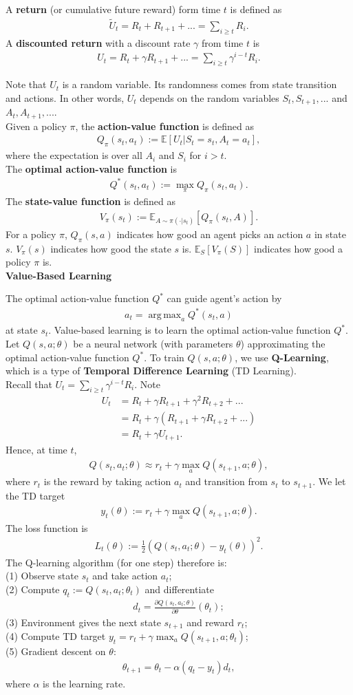 \documentclass[12pt,oneside]{article}
\newcommand{\BE}[0]{\mathbb{E}}
\newcommand{\ali}[1]{\begin{align*}#1\end{align*}}
\newcommand{\ga}[0]{\gamma}
\DeclareMathOperator*{\argmax}{arg\,max}
\theoremstyle{plain}
\theoremstyle{remark}
\begin{document}
A {\bf return} (or cumulative future reward) form time $t$ is defined as 
\ali{\tilde{U}_t = R_t + R_{t+1} + ... = \sum_{i \geq t} R_i.}
A {\bf discounted return} with a discount rate $\ga$ from time $t$ is 
\ali{U_t  = R_t + \ga R_{t+1} + ... = \sum_{i \geq t} \ga^{i-t} R_i.}

Note that $U_t$ is a random variable. Its randomness comes from state transition and actions. In other words, $U_t$ depends on the random variables $S_t, S_{t+1},...$ and $A_t, A_{t+1},...$.\\

Given a policy $\pi$, the {\bf action-value function} is defined as
 \ali{Q_\pi(s_t, a_t) := \BE \left[ U_t | S_t = s_t, A_t = a_t \right],}
where the expectation is over all $A_{i}$ and $S_i$ for $i > t$.\\
The {\bf optimal action-value function} is 
\ali{Q^*(s_t, a_t) := \max_\pi  Q_\pi(s_t, a_t).}
The {\bf state-value function} is defined as 
\ali{V_\pi(s_t) := \BE_{A \sim \pi(\cdot| s_t)} \left[ Q_\pi(s_t, A) \right].}
For a policy $\pi$, $Q_\pi(s,a)$ indicates how good an agent picks an action $a$ in state $s$. $V_\pi(s)$ indicates how good the state $s$ is. $\BE_S \left[ V_\pi(S) \right]$ indicates how good a policy $\pi$ is.\\

{\bf Value-Based Learning\\}

The optimal action-value function $Q^*$ can guide agent's action by 
\ali{a_t = \argmax_a Q^*(s_t, a)}
at state $s_t$. Value-based learning is to learn the optimal action-value function $Q^*$.\\
Let $Q(s, a; \theta)$ be a neural network (with parameters $\theta$) approximating the optimal action-value function $Q^*$. To train $Q(s, a; \theta)$, we use {\bf Q-Learning}, which is a type of {\bf Temporal Difference Learning} (TD Learning).\\
Recall that $U_t = \sum_{i \geq t} \ga^{i-t} R_i$. Note 
\ali{U_t &= R_t + \ga R_{t+1} + \ga^2 R_{t+2} + ... \\
         &= R_t + \ga (R_{t+1} + \ga R_{t+2} + ...) \\
         &= R_t + \ga U_{t+1}.}
Hence, at time $t$,
\ali{Q(s_t, a_t; \theta) \approx r_t + \ga \max_a Q(s_{t+1}, a; \theta),}
where $r_t$ is the reward by taking action $a_t$ and transition from $s_t$ to $s_{t+1}$. We let the TD target 
\ali{y_t(\theta) := r_t + \ga \max_a Q(s_{t+1}, a; \theta).}
The loss function is 
\ali{L_t(\theta) := \frac{1}{2} (Q(s_t, a_t; \theta) - y_t(\theta))^2.}
The Q-learning algorithm (for one step) therefore is:\\
(1) Observe state $s_t$ and take action $a_t$;\\
(2) Compute $q_t := Q(s_t, a_t; \theta_t)$ and differentiate 
\ali{d_t = \frac{\partial Q(s_t, a_t; \theta)}{\partial \theta}(\theta_t);}
(3) Environment gives the next state $s_{t+1}$ and reward $r_t$;\\
(4) Compute TD target $y_t = r_t + \ga \max_a Q(s_{t+1}, a; \theta_t)$;\\
(5) Gradient descent on $\theta$: 
\ali{\theta_{t+1} = \theta_t - \alpha (q_t - y_t) d_t,}
where $\alpha$ is the learning rate.\\
\end{document}
